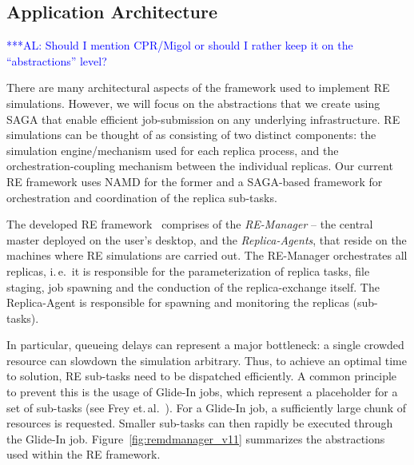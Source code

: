 \documentclass[conference,final]{IEEEtran}
\newcommand{\up}{\vspace*{-1em}}
\newcommand{\alnote}[1]{ {\textcolor{blue} { ***AL: #1 }}}
\newcommand{\alnote}[1]{}
\begin{document}

\up

\subsection{Application Architecture}

\up

\alnote{Should I mention CPR/Migol or should I rather keep it on the
  ``abstractions'' level?}

There are many architectural aspects of the framework used to
implement RE simulations. However, we will focus on the abstractions
that we create using SAGA that enable efficient job-submission on any
underlying infrastructure.  RE simulations can be thought of as
consisting of two distinct components: the simulation engine/mechanism
used for each replica process, and the orchestration-coupling
mechanism between the individual replicas. Our current RE framework
uses NAMD for the former and a SAGA-based framework for orchestration
and coordination of the replica sub-tasks.

The developed RE framework~\cite{Luckow:2008la} comprises of the
\emph{RE-Manager} -- the central master deployed on the user's
desktop, and the \textit{Replica-Agents}, that reside on the machines
where RE simulations are carried out. The RE-Manager orchestrates all
replicas, i.\,e.\ it is responsible for the parameterization of
replica tasks, file staging, job spawning and the conduction of the
replica-exchange itself.  The Replica-Agent %
is responsible for spawning and monitoring the replicas (sub-tasks).

In particular, queueing delays can represent a major bottleneck: a
single crowded resource can slowdown the simulation arbitrary. Thus,
to achieve an optimal time to solution, RE sub-tasks need to be
dispatched efficiently.  A common principle to prevent this is the
usage of Glide-In jobs, which represent a placeholder for a set of
sub-tasks (see Frey et.\,al.~\cite{citeulike:291860}).  For a Glide-In
job, a sufficiently large chunk of resources is requested. Smaller
sub-tasks can then rapidly be executed through the Glide-In job.
Figure~\ref{fig:remdmanager_v11} summarizes the abstractions used
within the RE framework.
\end{document}
